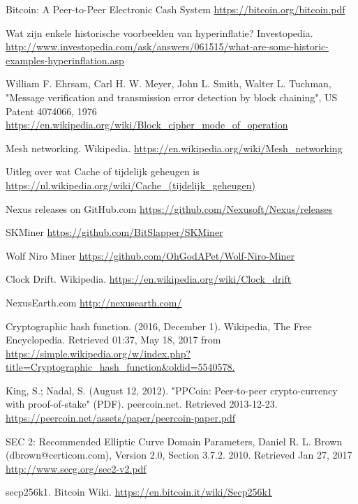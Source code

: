 \documentclass[11pt]{article}
\begin{document}
\pagebreak
\begin{thebibliography}{7}

Bitcoin: A Peer-to-Peer Electronic Cash System \url{https://bitcoin.org/bitcoin.pdf}

Wat zijn enkele historische voorbeelden van hyperinflatie? Investopedia.
\url{http://www.investopedia.com/ask/answers/061515/what-are-some-historic-examples-hyperinflation.asp}

William F. Ehrsam, Carl H. W. Meyer, John L. Smith, Walter L. Tuchman, "Message verification and transmission error detection by block chaining", US Patent 4074066, 1976 \url{https://en.wikipedia.org/wiki/Block_cipher_mode_of_operation}

Mesh networking. Wikipedia.
\url{https://en.wikipedia.org/wiki/Mesh_networking}

Uitleg over wat Cache of tijdelijk geheugen is
\url{https://nl.wikipedia.org/wiki/Cache_(tijdelijk_geheugen)}

Nexus releases on GitHub.com
\url{https://github.com/Nexusoft/Nexus/releases}

SKMiner
\url{https://github.com/BitSlapper/SKMiner}

Wolf Niro Miner
\url{https://github.com/OhGodAPet/Wolf-Niro-Miner}

Clock Drift. Wikipedia.
\url{https://en.wikipedia.org/wiki/Clock_drift}

NexusEarth.com
\url{http://nexusearth.com/}

Cryptographic hash function. (2016, December 1). Wikipedia, The Free Encyclopedia. Retrieved 01:37, May 18, 2017 from \url{https://simple.wikipedia.org/w/index.php?title=Cryptographic_hash_function&oldid=5540578.}

King, S.; Nadal, S. (August 12, 2012). "PPCoin: Peer-to-peer crypto-currency with proof-of-stake" (PDF). peercoin.net. Retrieved 2013-12-23. \url{https://peercoin.net/assets/paper/peercoin-paper.pdf}

SEC 2: Recommended Elliptic Curve Domain Parameters, Daniel R. L. Brown (dbrown@certicom.com), Version 2.0, Section 3.7.2. 2010. Retrieved Jan 27, 2017 \url{http://www.secg.org/sec2-v2.pdf}

secp256k1. Bitcoin Wiki.
\url{https://en.bitcoin.it/wiki/Secp256k1}


\end{thebibliography}
\end{document}
